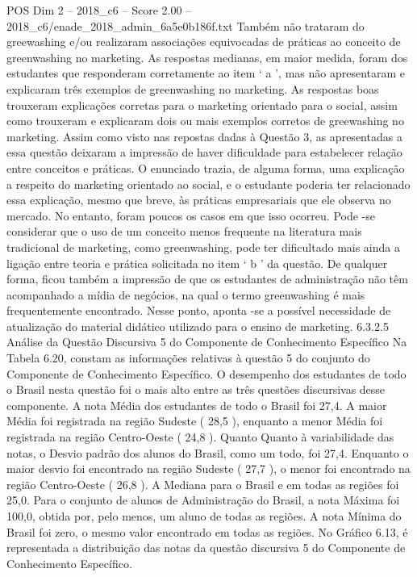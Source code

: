 \begin{textsample}{POS Dim 2 – 2018\_c6 – Score 2.00 – 2018\_c6/enade\_2018\_admin\_6a5e0b186f.txt}
Também não trataram do greewashing e/ou realizaram associações equivocadas de práticas ao conceito de greenwashing no marketing.
As respostas medianas, em maior medida, foram dos estudantes que responderam corretamente ao item ‘ a ’, mas não apresentaram e explicaram três exemplos de greenwashing no marketing.
As respostas boas trouxeram explicações corretas para o marketing orientado para o social, assim como trouxeram e explicaram dois ou mais exemplos corretos de greewashing no marketing.
Assim como visto nas repostas dadas à Questão 3, as apresentadas a essa questão deixaram a impressão de haver dificuldade para estabelecer relação entre conceitos e práticas.
O enunciado trazia, de alguma forma, uma explicação a respeito do marketing orientado ao social, e o estudante poderia ter relacionado essa explicação, mesmo que breve, às práticas empresariais que ele observa no mercado.
No entanto, foram poucos os casos em que isso ocorreu.
Pode -se considerar que o uso de um conceito menos frequente na literatura mais tradicional de marketing, como greenwashing, pode ter dificultado mais ainda a ligação entre teoria e prática solicitada no item ‘ b ’ da questão.
De qualquer forma, ficou também a impressão de que os estudantes de administração não têm acompanhado a mídia de negócios, na qual o termo greenwashing é mais frequentemente encontrado.
Nesse ponto, aponta -se a possível necessidade de atualização do material didático utilizado para o ensino de marketing. 6.3.2.5 Análise da Questão Discursiva 5 do Componente de Conhecimento Específico Na Tabela 6.20, constam as informações relativas à questão 5 do conjunto do Componente de Conhecimento Específico.
O desempenho dos estudantes de todo o Brasil nesta questão foi o mais alto entre as três questões discursivas desse componente.
A nota Média dos estudantes de todo o Brasil foi 27,4.
A maior Média foi registrada na região Sudeste ( 28,5 ), enquanto a menor Média foi registrada na região Centro-Oeste ( 24,8 ).
Quanto Quanto à variabilidade das notas, o Desvio padrão dos alunos do Brasil, como um todo, foi 27,4.
Enquanto o maior desvio foi encontrado na região Sudeste ( 27,7 ), o menor foi encontrado na região Centro-Oeste ( 26,8 ).
A Mediana para o Brasil e em todas as regiões foi 25,0.
Para o conjunto de alunos de Administração do Brasil, a nota Máxima foi 100,0, obtida por, pelo menos, um aluno de todas as regiões.
A nota Mínima do Brasil foi zero, o mesmo valor encontrado em todas as regiões.
No Gráfico 6.13, é representada a distribuição das notas da questão discursiva 5 do Componente de Conhecimento Específico.

\end{textsample}
